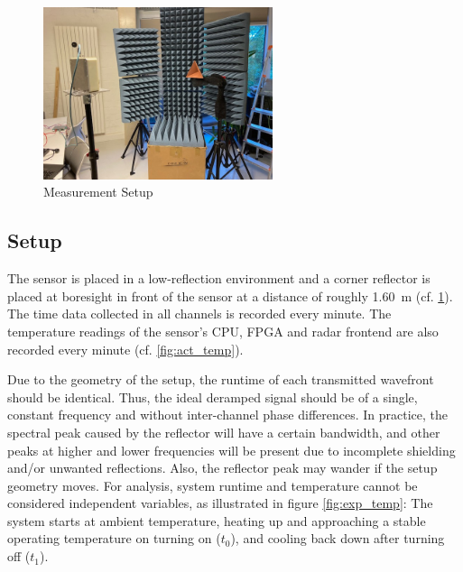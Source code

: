 \begin{figure}
    \centering
    \includegraphics[width=0.6\textwidth]{../figures/aufbau1.jpg}
    \caption{Measurement Setup}
    \label{fig:photo_setup}
\end{figure}
\subsection{Setup}
The sensor is placed in a low-reflection environment and a corner reflector is placed at boresight in front of the sensor at a distance of roughly \SI{1.60}{\m} (cf. \ref{fig:photo_setup}).
The time data collected in all channels is recorded every minute.
The temperature readings of the sensor's CPU, FPGA and radar frontend are also recorded every minute (cf. \ref{fig:act_temp}).

Due to the geometry of the setup, the runtime of each transmitted wavefront should be identical.
Thus, the ideal deramped signal should be of a single, constant frequency and without inter-channel phase differences.
In practice, the spectral peak caused by the reflector will have a certain bandwidth,
and other peaks at higher and lower frequencies will be present due to incomplete shielding and/or unwanted reflections.
Also, the reflector peak may wander if the setup geometry moves.
For analysis, system runtime and temperature cannot be considered independent variables, as illustrated in figure \ref{fig:exp_temp}:
The system starts at ambient temperature, heating up and approaching a stable operating temperature on turning on ($t_0$), and cooling back down after turning off ($t_1$).

